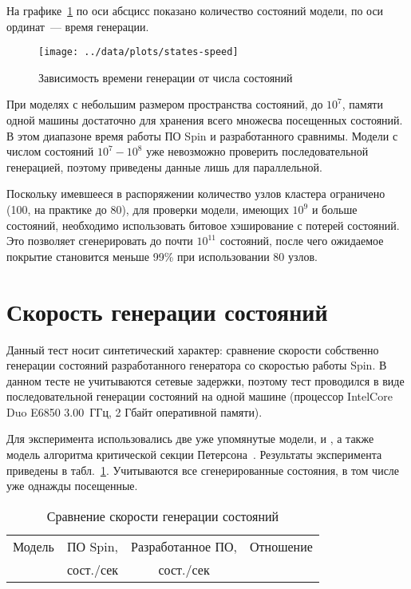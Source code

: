 На графике~\ref{fig:states-speed} по оси абсцисс показано количество состояний модели, по
оси ординат~--- время генерации.

\begin{figure}[ht]
  \centering
  \texttt{[image: ../data/plots/states-speed]}
  \caption{Зависимость времени генерации от числа состояний}
  \label{fig:states-speed}
\end{figure}

При моделях с небольшим размером пространства состояний, до $10^7$, памяти одной машины
достаточно для хранения всего множесва посещенных состояний. В этом диапазоне время работы
ПО Spin и разработанного сравнимы. Модели с числом состояний $10^7-10^8$ уже невозможно
проверить последовательной генерацией, поэтому приведены данные лишь для
параллельной. 

Поскольку имевшееся в распоряжении количество узлов кластера ограничено (100, на практике
до 80), для проверки модели, имеющих $10^9$ и больше состояний, необходимо использовать
битовое хэширование с потерей состояний. Это позволяет сгенерировать до почти $10^{11}$
состояний, после чего ожидаемое покрытие становится меньше 99\% при использовании 80
узлов.

\section{Скорость генерации состояний}
\label{sec:stategen-speed}

Данный тест носит синтетический характер: сравнение скорости собственно генерации
состояний разработанного генератора со скоростью работы Spin. В данном тесте не
учитываются сетевые задержки, поэтому тест проводился в виде последовательной генерации
состояний на одной машине (процессор Intel\regsign Core Duo E6850 3.00~ГГц, 2
Гбайт оперативной памяти).

Для эксперимента использовались две уже упомянутые модели,  и ,
а также модель алгоритма критической секции Петерсона~\cite{SPIN}. Результаты эксперимента
приведены в табл.~\ref{tab:stategen-speed}. Учитываются все сгенерированные состояния, в
том числе уже однажды посещенные.

\begin{table}[ht]
  \centering
  \caption{Сравнение скорости генерации состояний}
  \begin{tabular}{cccc}
    \hline
    Модель & ПО Spin,   & Разработанное ПО, & Отношение \\
           &  сост./сек &  сост./сек        &           \\
    \hline
    
    \hline
  \end{tabular}
  \label{tab:stategen-speed}
\end{table}

